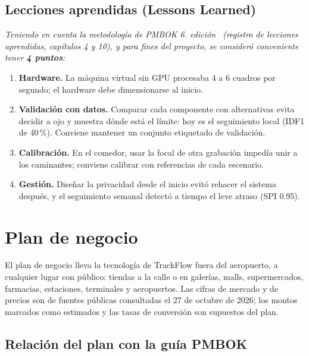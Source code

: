 \documentclass[12pt,a4paper]{article}
\begin{document}
\subsection{Lecciones aprendidas (Lessons Learned)}
\label{sec:lecciones}

\textit{Teniendo en cuenta la metodología de PMBOK 6.\textordfeminine{} edición~\cite{pmbok6}
(registro de lecciones aprendidas, capítulos 4 y 10), y para fines del
proyecto, se consideró conveniente tener \textbf{4 puntos}:}

\begin{enumerate}
    \item \textbf{Hardware.} La máquina virtual sin GPU procesaba 4 a 6 cuadros
    por segundo; el hardware debe dimensionarse al inicio.

    \item \textbf{Validación con datos.} Comparar cada componente con
    alternativas evita decidir a ojo y muestra dónde está el límite: hoy es el
    seguimiento local (IDF1 de 40\,\%). Conviene mantener un conjunto
    etiquetado de validación.

    \item \textbf{Calibración.} En el comedor, usar la focal de otra grabación
    impedía unir a los caminantes; conviene calibrar con referencias de cada
    escenario.

    \item \textbf{Gestión.} Diseñar la privacidad desde el inicio evitó rehacer
    el sistema después, y el seguimiento semanal detectó a tiempo el leve
    atraso (SPI 0.95).
\end{enumerate}

\section{Plan de negocio}
\label{sec:negocio}

El plan de negocio lleva la tecnología de TrackFlow fuera del aeropuerto, a
cualquier lugar con público: tiendas a la calle o en galerías, malls,
supermercados, farmacias, estaciones, terminales y aeropuertos. Las cifras de
mercado y de precios son de fuentes públicas consultadas el 27 de octubre de
2026; los montos marcados como estimados y las tasas de conversión son
supuestos del plan.

\subsection{Relación del plan con la guía PMBOK}
\end{document}
